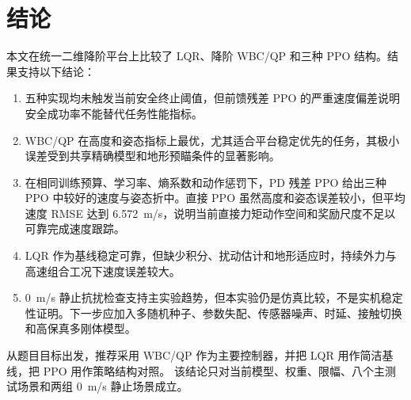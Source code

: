 \documentclass[UTF8,12pt,a4paper,fontset=none]{ctexart}
\begin{document}
\section{结论}
本文在统一二维降阶平台上比较了 LQR、降阶 WBC/QP 和三种 PPO 结构。结果支持以下结论：
\begin{enumerate}
  \item 五种实现均未触发当前安全终止阈值，但前馈残差 PPO 的严重速度偏差说明安全成功率不能替代任务性能指标。
  \item WBC/QP 在高度和姿态指标上最优，尤其适合平台稳定优先的任务，其极小误差受到共享精确模型和地形预瞄条件的显著影响。
  \item 在相同训练预算、学习率、熵系数和动作惩罚下，PD 残差 PPO 给出三种 PPO 中较好的速度与姿态折中。直接 PPO 虽然高度和姿态误差较小，但平均速度 RMSE 达到 \SI{6.572}{m/s}，说明当前直接力矩动作空间和奖励尺度不足以可靠完成速度跟踪。
  \item LQR 作为基线稳定可靠，但缺少积分、扰动估计和地形适应时，持续外力与高速组合工况下速度误差较大。
  \item \SI{0}{m/s} 静止抗扰检查支持主实验趋势，但本实验仍是仿真比较，不是实机稳定性证明。下一步应加入多随机种子、参数失配、传感器噪声、时延、接触切换和高保真多刚体模型。
\end{enumerate}

从题目目标出发，推荐采用 WBC/QP 作为主要控制器，并把 LQR 用作简洁基线，把 PPO 用作策略结构对照。
该结论只对当前模型、权重、限幅、八个主测试场景和两组 \SI{0}{m/s} 静止场景成立。
\end{document}

